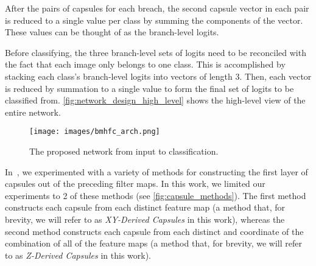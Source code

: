 \documentclass{article}
\begin{document}
After the pairs of capsules for each breach, the second capsule vector in each pair is reduced to a single value per class by summing the components of the vector.  These values can be thought of as the branch-level logits.

Before classifying, the three branch-level sets of logits need to be reconciled with the fact that each image only belongs to one class.  This is accomplished by stacking each class's branch-level logits into vectors of length 3.  Then, each vector is reduced by summation to a single value to form the final set of logits to be classified from.  \autoref{fig:network_design_high_level} shows the high-level view of the entire network.

\begin{figure}[!ht]
  \centering
  \texttt{[image: images/bmhfc\_arch.png]}
  \caption{The proposed network from input to classification.}\label{fig:network_design_high_level}
\end{figure}

In~\cite{Byerly2019}, we experimented with a variety of methods for constructing the first layer of capsules out of the preceding filter maps.  In this work, we limited our experiments to 2 of these methods (see \autoref{fig:capsule_methods}).  The first method constructs each capsule from each distinct feature map (a method that, for brevity, we will refer to as \textit{XY-Derived Capsules} in this work), whereas the second method constructs each capsule from each distinct  and  coordinate of the combination of all of the feature maps (a method that, for brevity, we will refer to as \textit{Z-Derived Capsules} in this work).
\end{document}
